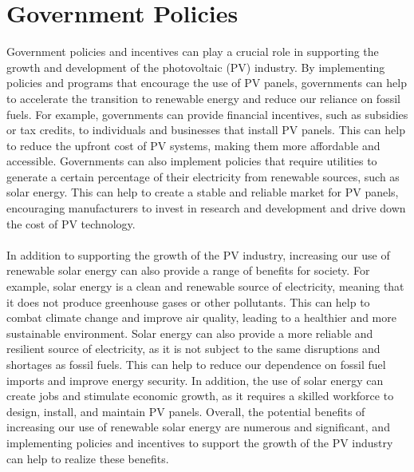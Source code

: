 \documentclass{report}
\begin{document}
\section{Government Policies}
Government policies and incentives can play a crucial role in supporting the growth and development of the photovoltaic (PV) industry. By implementing policies and programs that encourage the use of PV panels, governments can help to accelerate the transition to renewable energy and reduce our reliance on fossil fuels. For example, governments can provide financial incentives, such as subsidies or tax credits, to individuals and businesses that install PV panels. This can help to reduce the upfront cost of PV systems, making them more affordable and accessible. Governments can also implement policies that require utilities to generate a certain percentage of their electricity from renewable sources, such as solar energy. This can help to create a stable and reliable market for PV panels, encouraging manufacturers to invest in research and development and drive down the cost of PV technology.\\
\\
In addition to supporting the growth of the PV industry, increasing our use of renewable solar energy can also provide a range of benefits for society. For example, solar energy is a clean and renewable source of electricity, meaning that it does not produce greenhouse gases or other pollutants. This can help to combat climate change and improve air quality, leading to a healthier and more sustainable environment. Solar energy can also provide a more reliable and resilient source of electricity, as it is not subject to the same disruptions and shortages as fossil fuels. This can help to reduce our dependence on fossil fuel imports and improve energy security. In addition, the use of solar energy can create jobs and stimulate economic growth, as it requires a skilled workforce to design, install, and maintain PV panels. Overall, the potential benefits of increasing our use of renewable solar energy are numerous and significant, and implementing policies and incentives to support the growth of the PV industry can help to realize these benefits.
\end{document}
